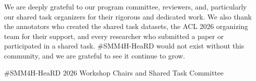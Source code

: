 \par\vspace{1em}
We are deeply grateful to our program committee, reviewers, and, particularly our shared task organizers for their rigorous and dedicated work. We also thank the annotators who created the shared task datasets, the ACL 2026 organizing team for their support, and every researcher who submitted a paper or participated in a shared task. \#SMM4H-HeaRD would not exist without this community, and we are grateful to see it continue to grow.

\par\vspace{2em}
\#SMM4H-HeaRD 2026 Workshop Chairs and Shared Task Committee
